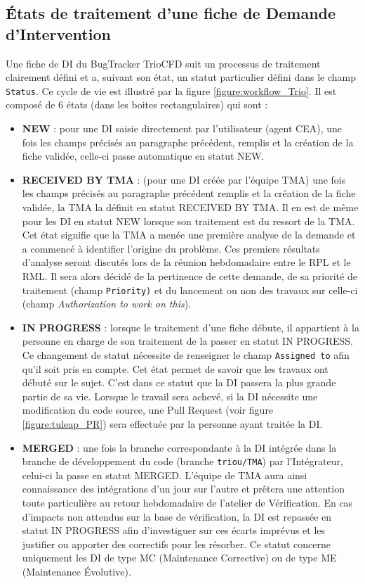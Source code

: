 \subsection{\label{sec:etatsDI}États de traitement d'une fiche de Demande d'Intervention }
Une fiche de DI du BugTracker TrioCFD suit un processus de traitement clairement défini et a, suivant son état, un statut particulier défini dans le champ \texttt{Status}. Ce cycle de vie est illustré par la figure \ref{figure:workflow_Trio}. Il est composé de 6 états (dans les boites rectangulaires) qui sont :\newline
\begin{itemize}[label=$\Rightarrow$, font=\LARGE]
   \item \textbf{NEW} : pour une DI saisie directement par l'utilisateur (agent CEA), une fois les champs précisés au paragraphe précédent, remplis et la création de la fiche validée, celle-ci passe automatique en statut NEW.
   \item \textbf{RECEIVED BY TMA} : (pour une DI créée par l'équipe TMA) une fois les champs précisés au paragraphe précédent remplis et la création de la fiche validée, la TMA la définit en statut RECEIVED BY TMA. Il en est de même pour les DI en statut NEW lorsque son traitement est du ressort de la TMA. Cet état signifie que la TMA a menée une première analyse de la demande et a commencé à identifier l'origine du problème. Ces premiers résultats d'analyse seront discutés lors de la réunion hebdomadaire entre le RPL et le RML. Il sera alors décidé de la pertinence de cette demande, de sa priorité de traitement (champ \texttt{Priority)} et du lancement ou non des travaux sur celle-ci (champ \textit{Authorization to work on this}).
   \item \textbf{IN PROGRESS} : lorsque le traitement d'une fiche débute, il appartient à la personne en charge de son traitement de la passer en statut IN PROGRESS. Ce changement de statut nécessite de renseigner le champ \texttt{Assigned to} afin qu'il soit pris en compte. Cet état permet de savoir que les travaux ont débuté sur le sujet. C'est dans ce statut que la DI passera la plus grande partie de sa vie. Lorsque le travail sera achevé, si la DI nécessite une modification du code source, une Pull Request (voir figure \ref{figure:tuleap_PR}) sera effectuée par la personne ayant traitée la DI.
   \item \textbf{MERGED} : une fois la branche correspondante à la DI intégrée dans la branche de développement du code (branche \texttt{triou/TMA}) par l'Intégrateur, celui-ci la passe en statut MERGED. L'équipe de TMA aura ainsi connaissance des intégrations d'un jour sur l'autre et prêtera une attention toute particulière au retour hebdomadaire de l'atelier de Vérification. En cas d'impacts non attendus sur la base de vérification, la DI est repassée en statut IN PROGRESS afin d'investiguer sur ces écarts imprévus et les justifier ou apporter des correctifs pour les résorber. Ce statut concerne uniquement les DI de type MC (Maintenance Corrective) ou de type ME (Maintenance Évolutive). 

\end{itemize}
